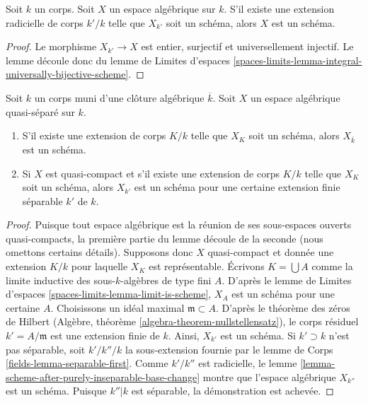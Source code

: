 \begin{lemma}
\label{lemma-scheme-after-purely-inseparable-base-change}
Soit $k$ un corps. Soit $X$ un espace algébrique sur $k$.
S'il existe une extension radicielle de corps $k'/k$
telle que $X_{k'}$ soit un schéma, alors $X$ est un schéma.
\end{lemma}

\begin{proof}
Le morphisme $X_{k'} \to X$ est entier, surjectif et
universellement injectif. Le lemme découle donc du
lemme de Limites d'espaces
\ref{spaces-limits-lemma-integral-universally-bijective-scheme}.
\end{proof}

\begin{lemma}
\label{lemma-when-scheme-after-base-change}
Soit $k$ un corps muni d'une clôture algébrique $\overline{k}$.
Soit $X$ un espace algébrique quasi-séparé sur $k$.
\begin{enumerate}
\item S'il existe une extension de corps $K/k$ telle que
$X_K$ soit un schéma, alors $X_{\overline{k}}$ est un schéma.
\item Si $X$ est quasi-compact et s'il existe une extension de corps
$K/k$ telle que $X_K$ soit un schéma, alors $X_{k'}$
est un schéma pour une certaine extension finie séparable $k'$ de $k$.
\end{enumerate}
\end{lemma}

\begin{proof}
Puisque tout espace algébrique est la réunion de ses sous-espaces ouverts
quasi-compacts, la première partie du lemme découle de
la seconde (nous omettons certains détails). Supposons donc $X$ quasi-compact
et donnée une extension $K/k$ pour laquelle $X_K$ est représentable.
Écrivons $K = \bigcup A$ comme la limite inductive des sous-$k$-algèbres de type fini
$A$. D'après le lemme de Limites d'espaces \ref{spaces-limits-lemma-limit-is-scheme},
$X_A$ est un schéma pour une certaine $A$. Choisissons un idéal maximal
$\mathfrak m \subset A$. D'après le théorème des zéros de Hilbert
(Algèbre, théorème \ref{algebra-theorem-nullstellensatz}),
le corps résiduel $k' = A/\mathfrak m$ est une extension finie de $k$.
Ainsi, $X_{k'}$ est un schéma. Si $k' \supset k$ n'est pas
séparable, soit $k'/k''/k$ la sous-extension
fournie par le lemme de Corps \ref{fields-lemma-separable-first}.
Comme $k'/k''$ est radicielle, le
lemme \ref{lemma-scheme-after-purely-inseparable-base-change}
montre que l'espace algébrique $X_{k''}$ est un schéma. Puisque $k''|k$ est séparable,
la démonstration est achevée.
\end{proof}

